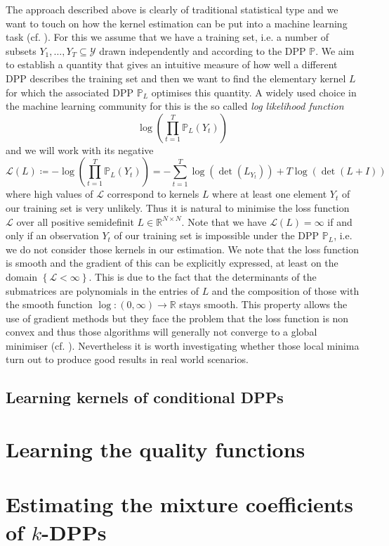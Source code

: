 The approach described above is clearly of traditional statistical type and we want to touch on how the kernel estimation can be put into a machine learning task (cf. \cite{affandi2014learning}). For this we assume that we have a training set, i.e. a number of subsets \(Y_1, \dots, Y_T\subseteq\mathcal Y\) drawn independently and according to the DPP \(\mathbb P\). We aim to establish a quantity that gives an intuitive measure of how well a different DPP describes the training set and then we want to find the elementary kernel \(L\) for which the associated DPP \(\mathbb P_L\) optimises this quantity. A widely used choice in the machine learning community for this is the so called \emph{log likelihood function}
\[\log\left(\prod_{t = 1}^T \mathbb P_L(Y_t)\right)\]
and we will work with its negative
\[\mathcal L(L) \coloneqq -\log\left(\prod_{t = 1}^T \mathbb P_L(Y_t)\right) = -\sum\limits_{t=1}^T\log\left( \det(L_{Y_t})\right) + T \log\left( \det(L+I)\right)\]
where high values of \(\mathcal L\) correspond to kernels \(L\) where at least one element \(Y_t\) of our training set is very unlikely. Thus it is natural to minimise the loss function \(\mathcal L\) over all positive semidefinit \(L\in\mathbb R^{N\times N}\). Note that we have \(\mathcal L(L) = \infty\) if and only if an observation \(Y_t\) of our training set is impossible under the DPP \(\mathbb P_L\), i.e. we do not consider those kernels in our estimation. We note that the loss function is smooth and the gradient of this can be explicitly expressed, at least on the domain \(\left\{ \mathcal L<\infty\right\}\). This is due to the fact that the determinants of the submatrices are polynomials in the entries of \(L\) and the composition of those with the smooth function \(\log\colon(0,\infty)\to\mathbb R\) stays smooth. This property allows the use of gradient methods but they face the problem that the loss function is non convex and thus those algorithms will generally not converge to a global minimiser (cf. \cite{affandi2014learning}). Nevertheless it is worth investigating whether those local minima turn out to produce good results in real world scenarios.

\subsection*{Learning kernels of conditional DPPs}

\section{Learning the quality functions}

\section{Estimating the mixture coefficients of \(k\)-DPPs}